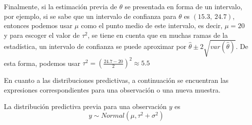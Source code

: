 \documentclass[10pt,openright]{book}\usepackage[]{graphicx}\usepackage[]{color}
\begin{document}
    Finalmente, si la estimaci\'on previa de $\theta$ se presentada en forma de un intervalo, por ejemplo, si se sabe que un intervalo de confianza para $\theta$ es $(15.3,\ 24.7)$, entonces podemos usar $\mu$ como el punto medio de este intervalo, es decir, $\mu=20$ y para escoger el valor de $\tau^2$, se tiene en cuenta que en muchas ramas de la estad\'istica, un intervalo de confianza se puede aproximar por $\hat{\theta}\pm 2\sqrt{var(\hat{\theta})}$. De esta forma, podemos usar $\tau^2=\left(\frac{24.7-20}{2}\right)^2\approx5.5$
    
    En cuanto a las distribuciones predictivas, a continuaci\'on se encuentran las expresiones correspondientes para una observaci\'on o una nueva muestra.
    
    \begin{Res}
    La distribuci\'on predictiva previa para una observaci\'on $y$ es
    \begin{equation*}
    y \sim Normal (\mu, \tau^2+\sigma^2)
    \end{equation*}
    \end{Res}
    
\end{document}
